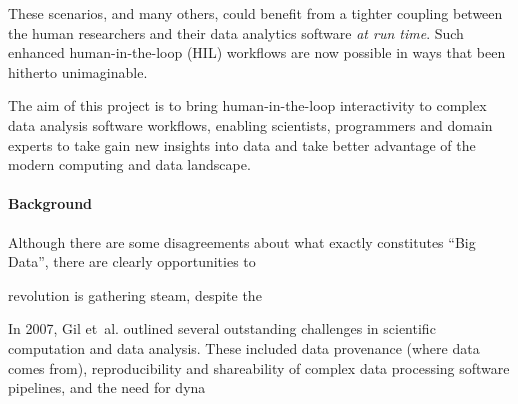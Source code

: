 \documentclass[a4paper]{scrartcl}
\begin{document}
These scenarios, and many others, could benefit from a tighter
coupling between the human researchers and their data analytics
software \emph{at run time}. Such enhanced human-in-the-loop (HIL)
workflows are now possible in ways that been hitherto unimaginable.

The aim of this project is to bring human-in-the-loop interactivity to
complex data analysis software workflows, enabling scientists,
programmers and domain experts to take gain new insights into data and
take better advantage of the modern computing and data landscape.


\paragraph{Background}


Although there are some disagreements about what exactly constitutes
``Big Data''\parencite{TODO}, there are clearly opportunities to 

revolution is gathering steam, despite the 



In 2007, Gil et~al. \parencite{Gil2007} outlined several outstanding
challenges in scientific computation and data analysis. These included data
provenance (where data comes from), reproducibility and shareability
of complex data processing software pipelines, and the need for dyna
\end{document}
